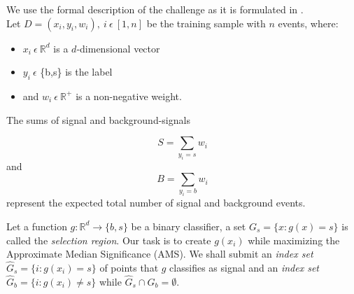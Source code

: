 We use the formal description of the challenge as it is formulated in \cite{higgsPaper}.\\
Let $D = {(x_i,y_i,w_i)}, \ i \ \epsilon \ [1,n]$ be the training sample with $n$ events, where:

\begin{itemize}
	\item $x_i \ \epsilon \ \mathbb{R}^{d}$ is a $d$-dimensional vector
	\item $y_i \ \epsilon$ \{b,s\} is the label
	\item and $w_i \ \epsilon \ \mathbb{R}^{+}$ is a non-negative weight.
\end{itemize}

The sums of signal and background-signals

$$S = \sum_{y_i = s} w_i$$ and $$B = \sum_{y_i = b} w_i$$ represent the expected total number of signal and background events.

Let a function $g:  \mathbb{R}^{d} \rightarrow \{b,s\}$ be a binary classifier, a set $ G_s = \{x : g(x) = s \} $ is called the \textit{selection region}.
Our task is to create $g(x_i)$ while maximizing the Approximate Median Significance (AMS). We shall submit an \textit{index set} 
$ \hat{G}_s = \{i : g(x_i) = s \} $ of points that $g$ classifies as signal and an \textit{index set} $ \hat{G}_b = \{i : g(x_i) \neq s \} $ while $\hat{G}_s \cap \hat{G}_b = \emptyset$.